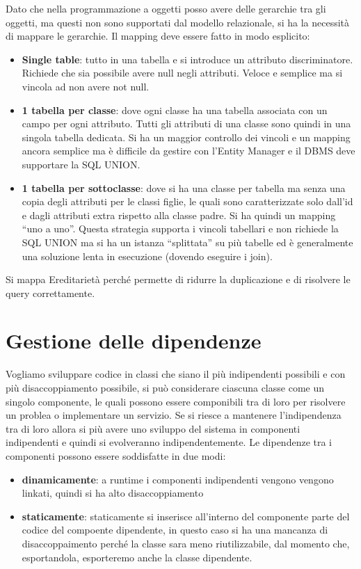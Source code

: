 Dato che nella programmazione a oggetti posso avere delle gerarchie tra gli oggetti,
ma questi non sono supportati dal modello relazionale, si ha la necessità di mappare
le gerarchie. Il mapping deve essere fatto in modo esplicito:
\begin{itemize}
      \item \textbf{Single table}: tutto in una tabella e si introduce un attributo
            discriminatore. Richiede che sia possibile avere null negli attributi.
            Veloce e semplice ma si vincola ad non avere not null.
      \item \textbf{1 tabella per classe}: dove ogni classe ha una tabella
            associata con un campo per ogni attributo. Tutti gli attributi di una
            classe sono quindi in una singola tabella dedicata. Si ha un maggior
            controllo dei vincoli e un mapping ancora semplice ma è difficile
            da gestire con l'Entity Manager e il DBMS deve supportare la SQL
            UNION.
      \item \textbf{1 tabella per sottoclasse}: dove si ha una classe per tabella
            ma senza una copia degli attributi per le classi figlie, le quali sono
            caratterizzate solo dall'id e dagli attributi extra rispetto alla
            classe padre. Si ha quindi un mapping “uno a uno”. Questa strategia
            supporta i vincoli tabellari e non richiede la SQL UNION ma si ha un
            istanza “splittata” su più tabelle ed è generalmente una soluzione
            lenta in esecuzione (dovendo eseguire i join).
\end{itemize}
Si mappa Ereditarietà perché permette di ridurre la duplicazione e di risolvere
le query correttamente.


\section{Gestione delle dipendenze}
Vogliamo sviluppare codice in classi che siano il più indipendenti possibili e con
più disaccoppiamento possibile, si può considerare ciascuna classe come un singolo
componente, le quali possono essere componibili tra di loro per risolvere un problea
o implementare un servizio. Se si riesce a mantenere l'indipendenza tra di loro
allora si più avere uno sviluppo del sistema in componenti indipendenti e quindi 
si evolveranno indipendentemente. Le dipendenze tra i componenti possono essere 
soddisfatte in due modi:
\begin{itemize}
    \item \textbf{dinamicamente}: a runtime i componenti indipendenti vengono vengono 
    linkati, quindi si ha alto disaccoppiamento 
    \item \textbf{staticamente}: staticamente si inserisce all'interno del componente
    parte del codice del compoente dipendente, in questo caso si ha una mancanza di
    disaccoppaimento perché la classe sara meno riutilizzabile, dal momento che,
    esportandola, esporteremo anche la classe dipendente.
\end{itemize}

